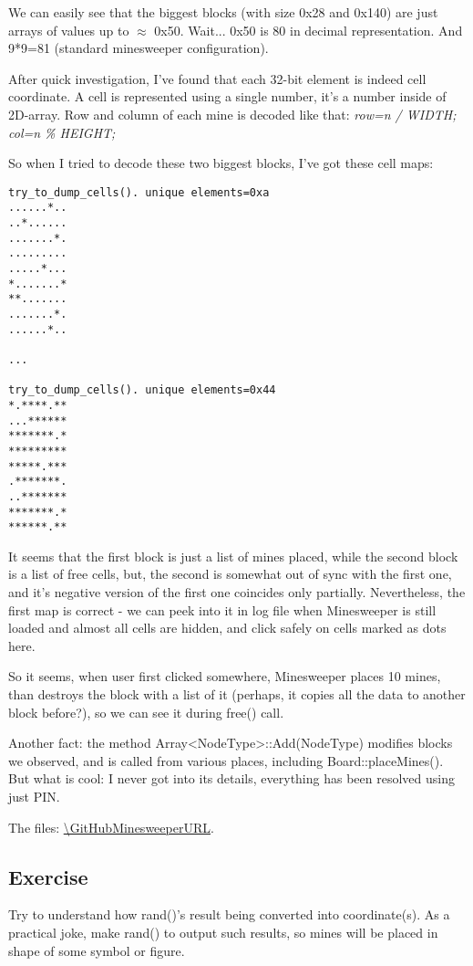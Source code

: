 We can easily see that the biggest blocks (with size 0x28 and 0x140) are just arrays of values up to $\approx$ 0x50.
Wait... 0x50 is 80 in decimal representation. And 9*9=81 (standard minesweeper configuration).

After quick investigation, I've found that each 32-bit element is indeed cell coordinate.
A cell is represented using a single number, it's a number inside of 2D-array.
Row and column of each mine is decoded like that: \emph{row=n / WIDTH; col=n \% HEIGHT;}

So when I tried to decode these two biggest blocks, I've got these cell maps:

\begin{lstlisting}
try_to_dump_cells(). unique elements=0xa
......*..
..*......
.......*.
.........
.....*...
*.......*
**.......
.......*.
......*..

...

try_to_dump_cells(). unique elements=0x44
*.****.**
...******
*******.*
*********
*****.***
.*******.
..*******
*******.*
******.**
\end{lstlisting}

It seems that the first block is just a list of mines placed, while the second block is a list of free cells, but, the second is somewhat out of sync with the first one,
and it's negative version of the first one coincides only partially.
Nevertheless, the first map is correct - we can peek into it in log file when Minesweeper is still loaded and almost all cells are hidden, and click safely on cells marked as dots here.

So it seems, when user first clicked somewhere, Minesweeper places 10 mines, than destroys the block with a list of it (perhaps, it copies all the data to another block before?),
so we can see it during free() call.

Another fact: the method Array<NodeType>::Add(NodeType) modifies blocks we observed, and is called from various places, including Board::placeMines().
But what is cool: I never got into its details, everything has been resolved using just PIN.

The files: \url{\GitHubMinesweeperURL}.

\subsection{Exercise}

Try to understand how rand()'s result being converted into coordinate(s).
As a practical joke, make rand() to output such results, so mines will be placed in shape of some symbol or figure.

